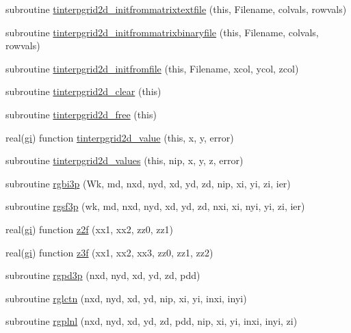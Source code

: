 \begin{DoxyCompactItemize}
subroutine \mbox{\hyperlink{namespaceinterpolation_aba9a8e8e9bf241c6a561b243f3e92620}{tinterpgrid2d\+\_\+initfrommatrixtextfile}} (this, Filename, colvals, rowvals)
\item 
subroutine \mbox{\hyperlink{namespaceinterpolation_a3420758fce41c1a63122fd3d35b973eb}{tinterpgrid2d\+\_\+initfrommatrixbinaryfile}} (this, Filename, colvals, rowvals)
\item 
subroutine \mbox{\hyperlink{namespaceinterpolation_aad92c485265e298041ddb85fdc576ca1}{tinterpgrid2d\+\_\+initfromfile}} (this, Filename, xcol, ycol, zcol)
\item 
subroutine \mbox{\hyperlink{namespaceinterpolation_a830b760c24924ee524054ca9f712d972}{tinterpgrid2d\+\_\+clear}} (this)
\item 
subroutine \mbox{\hyperlink{namespaceinterpolation_a05968790c56ace3a6aff6f9b81d35b0c}{tinterpgrid2d\+\_\+free}} (this)
\item 
real(\mbox{\hyperlink{namespaceinterpolation_a7242dea48715e8170bae81efe12c64be}{gi}}) function \mbox{\hyperlink{namespaceinterpolation_a77feb149313f842af954a528b8bff58e}{tinterpgrid2d\+\_\+value}} (this, x, y, error)
\item 
subroutine \mbox{\hyperlink{namespaceinterpolation_ad36dce10ba7587405b8862f7bea68d33}{tinterpgrid2d\+\_\+values}} (this, nip, x, y, z, error)
\item 
subroutine \mbox{\hyperlink{namespaceinterpolation_a44b1a5e85b19c58f04e2f7e3483cbb3f}{rgbi3p}} (Wk, md, nxd, nyd, xd, yd, zd, nip, xi, yi, zi, ier)
\item 
subroutine \mbox{\hyperlink{namespaceinterpolation_a1e2786e4f0a0a9dd065f757b66de84fd}{rgsf3p}} (wk, md, nxd, nyd, xd, yd, zd, nxi, xi, nyi, yi, zi, ier)
\item 
real(\mbox{\hyperlink{namespaceinterpolation_a7242dea48715e8170bae81efe12c64be}{gi}}) function \mbox{\hyperlink{namespaceinterpolation_a1046109eeab848ab2641b54b30004885}{z2f}} (xx1, xx2, zz0, zz1)
\item 
real(\mbox{\hyperlink{namespaceinterpolation_a7242dea48715e8170bae81efe12c64be}{gi}}) function \mbox{\hyperlink{namespaceinterpolation_aa80e5ef1a8e693b3c094f26f166cebf2}{z3f}} (xx1, xx2, xx3, zz0, zz1, zz2)
\item 
subroutine \mbox{\hyperlink{namespaceinterpolation_a20aedcecd7b269f068dfe4fcce012458}{rgpd3p}} (nxd, nyd, xd, yd, zd, pdd)
\item 
subroutine \mbox{\hyperlink{namespaceinterpolation_a2ddceaba83710295f2263bfbe4aa6924}{rglctn}} (nxd, nyd, xd, yd, nip, xi, yi, inxi, inyi)
\item 
subroutine \mbox{\hyperlink{namespaceinterpolation_ab2d80355a943b73b1de2cef700693500}{rgplnl}} (nxd, nyd, xd, yd, zd, pdd, nip, xi, yi, inxi, inyi, zi)
\end{DoxyCompactItemize}
